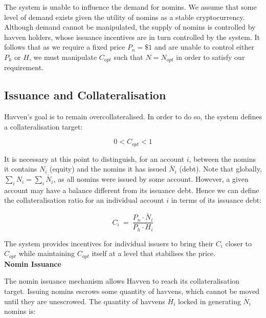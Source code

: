 \noindent The system is unable to influence the demand for nomins. We assume that some level of demand exists given the utility of nomins as a stable cryptocurrency. Although demand cannot be manipulated, the supply of nomins is controlled by havven holders, whose issuance incentives are in turn controlled by the system. It follows that as we require a fixed price $P_n = \$1 $ and are unable to control either $P_h$ or $H$, we must manipulate $C_{opt}$ such that $N = N_{opt}$ in order to satisfy our requirement.

\subsection{Issuance and Collateralisation} 

\noindent Havven's goal is to remain overcollateralised. In order to do so, the system defines a collateralisation target:

\begin{equation}
0 < C_{opt} < 1  \label{eq:target}
\end{equation}

\vspace{2 mm}

\noindent It is necessary at this point to distinguish, for an account $i$, between the nomins it contains $N_i$ (equity) and the nomins it has issued $\check{N_i}$ (debt). Note that globally, $\sum_{i}N_i = \sum_{i}\check{N_i}$, as all nomins were issued by some account. However, a given account may have a balance different from its issuance debt. Hence we can define the collateralisation ratio for an individual account $i$ in terms of its issuance debt:

\begin{equation}
C_i \ = \ \frac{P_n \cdot \check{N_i}}{P_h \cdot H_i}  \label{eq:individualcollateralisation}
\end{equation}

\vspace{2 mm}

\noindent The system provides incentives for individual issuers to bring their $C_i$ closer to $C_{opt}$ while maintaining $C_{opt}$ itself at a level that stabilises the price. \\

\noindent \textbf{Nomin Issuance}

\vspace{1mm}

\noindent The nomin issuance mechanism allows Havven to reach its collateralisation target.
Issuing nomins escrows some quantity of havvens, which cannot be moved until they are unescrowed.
The quantity of havvens $\check{H_i}$ locked in generating $\check{N_i}$ nomins is:

